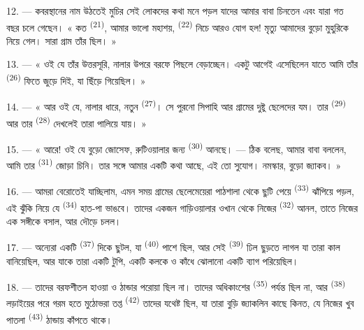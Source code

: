 12. --- কবরস্থানের নাম উঠতেই মুচির সেই লোকদের কথা মনে পড়ল যাদের আমার বাবা
চিনতেন এবং যারা গত বছর চলে গেছেন। « কত  \textsuperscript{(21)}, আমার
ভালো মহাশয়,  \textsuperscript{(22)} নিচে আরও যোগ হল! মৃত্যু
আমাদের বুড়ো মুহুরিকে নিয়ে গেল। সারা গ্রাম তাঁর 
ছিল। »

13. --- « ওই যে তাঁর উত্তরসূরি, নালার উপরে বরফে পিছলে বেড়াচ্ছেন। একটু আগেই
এসেছিলেন যাতে আমি তাঁর  \textsuperscript{(26)} ফিতে জুড়ে দিই,
যা ছিঁড়ে গিয়েছিল। »

14. --- « আর ওই যে, নালার ধারে, নতুন 
\textsuperscript{(27)}। সে পুরনো সিপাহি আর গ্রামের দুষ্টু ছেলেদের যম। তার
 \textsuperscript{(29)} আর তার 
\textsuperscript{(28)} দেখলেই তারা পালিয়ে যায়। »

15. --- « আরে! ওই যে বুড়ো জোসেফ, রুটিওয়ালার জন্য  \textsuperscript{(30)} আনছে। --- ঠিক বলেছ, আমার বাবা বললেন, আমি তার
 \textsuperscript{(31)} জোড়া চিনি। তার সঙ্গে আমার একটি কথা
আছে, এই তো সুযোগ। নমস্কার, বুড়ো জ্যাকব। »

16. --- আমরা বেরোতেই যাচ্ছিলাম, এমন সময় গ্রামের ছেলেমেয়েরা পাঠশালা থেকে ছুটি
পেয়ে  \textsuperscript{(33)} ঝাঁপিয়ে পড়ল, এই ঝুঁকি
নিয়ে যে  \textsuperscript{(34)} হাত-পা ভাঙবে। তাদের একজন
গাড়িওয়ালার ওখান থেকে নিজের  \textsuperscript{(32)} আনল, তাতে
নিজের এক সঙ্গীকে বসাল, আর দৌড়ে চলল।

17. --- অন্যেরা একটি  \textsuperscript{(37)} দিকে ছুটল, যা
 \textsuperscript{(40)} পাশে ছিল, আর সেই 
\textsuperscript{(39)} ঢিল ছুড়তে লাগল যা তারা কাল বানিয়েছিল, আর যাকে তারা
একটি টুপি, একটি কলকে ও কাঁধে ঝোলানো একটি ব্যাগ পরিয়েছিল।

18. --- তাদের বরফশীতল হাওয়া ও ঠান্ডার পরোয়া ছিল না। তাদের অধিকাংশের
 \textsuperscript{(35)} পর্যন্ত ছিল না, আর  \textsuperscript{(38)} লড়াইয়ের পরে গরম হতে মুঠোভরা তপ্ত
 \textsuperscript{(42)} তাদের যথেষ্ট ছিল, যা তারা বুড়ি
জ্যাকলিন  কাছে কিনত, যে নিজের খুব পাতলা 
\textsuperscript{(43)} ঠান্ডায় কাঁপতে থাকে।

\VUsaut{3.0mm}
\VUsaut{3.0mm}

\VUsaut{4.0mm}

